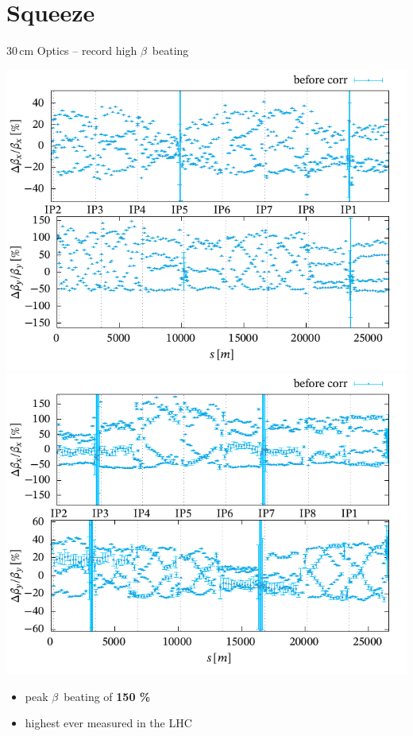 \documentclass[4pt,usenames,dvipsnames,aspectratio=169,table]{beamer}
\begin{document}
\section{Squeeze}


\begin{frame}{30\,cm Optics -- record high $\beta$~beating}

    \includegraphics[width=0.49\linewidth]{images/squeeze/b1_recordhigh.pdf}
    \hfill
    \includegraphics[width=0.49\linewidth]{images/squeeze/b2_recordhigh.pdf}
    
    \begin{itemize}
        \item peak $\beta$~beating of \textbf{150 \%}
        \item highest ever measured in the LHC
    \end{itemize}
    
\end{frame}
\end{document}
